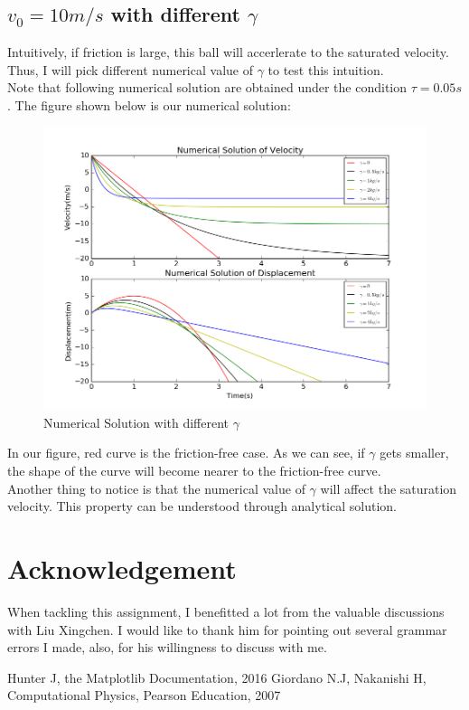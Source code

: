 \documentclass[10pt,a4paper]{article}
\begin{document}
    \subsection{$v_0=10m/s$ with different $\gamma$}
    Intuitively, if friction is large, this ball will accerlerate to the saturated velocity.\\
    Thus, I will pick different numerical value of $\gamma$ to test this intuition.\\
    Note that following numerical solution are obtained under the condition $\tau=0.05s$.
    The figure shown below is our numerical solution:\\
     \begin{figure}[htbp]
     	\centering
     	\includegraphics[width=5in]{Solution_2.png}
     	\caption{Numerical Solution with different $\gamma$}
     \end{figure}
    In our figure, red curve is the friction-free case. As we can see, if $\gamma$ gets smaller, the shape of the curve will become nearer to the friction-free curve.\\
    Another thing to notice is that the numerical value of $\gamma$ will affect the saturation velocity. This property can be understood through analytical solution.
    
    \section*{Acknowledgement}
    When tackling this assignment, I benefitted a lot from the valuable discussions with Liu Xingchen. I would like to thank him for pointing out several grammar errors I made, also, for his willingness to discuss with me.
    
    \begin{thebibliography}{99}
    	\bibitem{}Hunter J, the Matplotlib Documentation, 2016
    	\bibitem{}Giordano N.J, Nakanishi H, Computational Physics, Pearson Education, 2007
    \end{thebibliography} 
\end{document}
